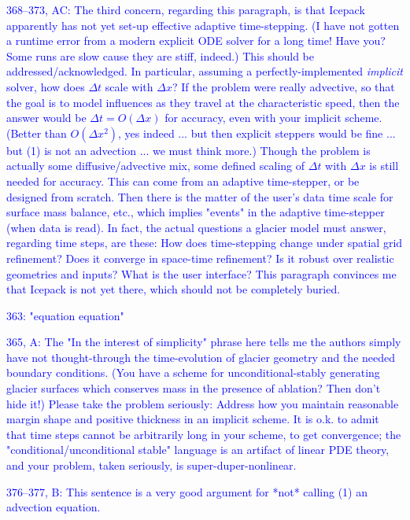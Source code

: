 \documentclass{article}
\theoremstyle{definition}
\theoremstyle{plain}
\begin{document}
\textcolor{blue}{368--373, AC:  The third concern, regarding this paragraph, is that Icepack apparently has not yet set-up effective adaptive time-stepping.  (I have not gotten a runtime error from a modern explicit ODE solver for a long time!  Have you?  Some runs are slow cause they are stiff, indeed.)  This should be addressed/acknowledged.  In particular, assuming a perfectly-implemented \emph{implicit} solver, how does $\Delta t$ scale with $\Delta x$?  If the problem were really advective, so that the goal is to model influences as they travel at the characteristic speed, then the answer would be $\Delta t = O(\Delta x)$ for accuracy, even with your implicit scheme.  (Better than $O(\Delta x^2)$, yes indeed ... but then explicit steppers would be fine ... but (1) is not an advection ... we must think more.)  Though the problem is actually some diffusive/advective mix, some defined scaling of $\Delta t$ with $\Delta x$ is still needed for accuracy.  This can come from an adaptive time-stepper, or be designed from scratch.  Then there is the matter of the user's data time scale for surface mass balance, etc., which implies "events" in the adaptive time-stepper (when data is read).  In fact, the actual questions a glacier model must answer, regarding time steps, are these:  How does time-stepping change under spatial grid refinement?  Does it converge in space-time refinement?  Is it robust over realistic geometries and inputs?  What is the user interface?  This paragraph convinces me that Icepack is not yet there, which should not be completely buried.}

\textcolor{blue}{363:  "equation equation"}

\textcolor{blue}{365, A:  The "In the interest of simplicity" phrase here tells me the authors simply have not thought-through the time-evolution of glacier geometry and the needed boundary conditions.  (You have a scheme for unconditional-stably generating glacier surfaces which conserves mass in the presence of ablation?  Then don't hide it!)  Please take the problem seriously:  Address how you maintain reasonable margin shape and positive thickness in an implicit scheme.  It is o.k. to admit that time steps cannot be arbitrarily long in your scheme, to get convergence; the "conditional/unconditional stable" language is an artifact of linear PDE theory, and your problem, taken seriously, is super-duper-nonlinear.}

\textcolor{blue}{376--377, B:  This sentence is a very good argument for *not* calling (1) an advection equation.}
\end{document}
